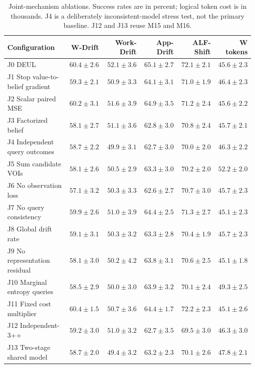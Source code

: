 \documentclass[sigconf,anonymous,review]{acmart}
\theoremstyle{zhplain}
\begin{document}


\begin{table}[t]
\centering
\caption{Joint-mechanism ablations. Success rates are in percent; logical token cost is in thousands. J4 is a deliberately inconsistent-model stress test, not the primary baseline. J12 and J13 reuse M15 and M16.}
\label{tab:joint}
\small
\begin{tabular}{@{}lrrrrr@{}}
\toprule
Configuration & W-Drift & Work-Drift & App-Drift & ALF-Shift & W tokens \\
\midrule
J0 DEUL & \(60.4\!\pm\!2.6\) & \(52.1\!\pm\!3.6\) & \(65.1\!\pm\!2.7\) & \(72.1\!\pm\!2.1\) & \(45.6\!\pm\!2.3\) \\
J1 Stop value-to-belief gradient & \(59.3\!\pm\!2.1\) & \(50.9\!\pm\!3.3\) & \(64.1\!\pm\!3.1\) & \(71.0\!\pm\!1.9\) & \(46.4\!\pm\!2.3\) \\
J2 Scalar paired MSE & \(60.2\!\pm\!3.1\) & \(51.6\!\pm\!3.9\) & \(64.9\!\pm\!3.5\) & \(71.2\!\pm\!2.4\) & \(45.6\!\pm\!2.2\) \\
J3 Factorized belief & \(58.1\!\pm\!2.7\) & \(51.1\!\pm\!3.6\) & \(62.8\!\pm\!3.0\) & \(70.8\!\pm\!2.4\) & \(45.7\!\pm\!2.1\) \\
J4 Independent query outcomes & \(58.7\!\pm\!2.2\) & \(49.9\!\pm\!3.1\) & \(62.7\!\pm\!3.0\) & \(70.0\!\pm\!2.0\) & \(46.3\!\pm\!2.2\) \\
J5 Sum candidate VOIs & \(58.1\!\pm\!2.6\) & \(50.5\!\pm\!2.9\) & \(63.3\!\pm\!3.0\) & \(70.2\!\pm\!2.0\) & \(52.2\!\pm\!2.0\) \\
J6 No observation loss & \(57.1\!\pm\!3.2\) & \(50.3\!\pm\!3.3\) & \(62.6\!\pm\!2.7\) & \(70.7\!\pm\!3.0\) & \(45.7\!\pm\!2.3\) \\
J7 No query consistency & \(59.9\!\pm\!2.6\) & \(51.0\!\pm\!3.9\) & \(64.4\!\pm\!2.5\) & \(71.3\!\pm\!2.7\) & \(45.1\!\pm\!2.3\) \\
J8 Global drift rate & \(59.1\!\pm\!3.1\) & \(50.3\!\pm\!3.2\) & \(63.3\!\pm\!2.8\) & \(70.4\!\pm\!1.9\) & \(45.7\!\pm\!2.3\) \\
J9 No representation residual & \(58.1\!\pm\!3.0\) & \(50.2\!\pm\!4.2\) & \(63.8\!\pm\!3.1\) & \(70.6\!\pm\!2.5\) & \(45.1\!\pm\!1.8\) \\
J10 Marginal entropy queries & \(58.5\!\pm\!2.9\) & \(50.0\!\pm\!3.0\) & \(63.9\!\pm\!3.2\) & \(70.1\!\pm\!2.4\) & \(49.3\!\pm\!2.5\) \\
J11 Fixed cost multiplier & \(60.4\!\pm\!1.5\) & \(50.7\!\pm\!3.6\) & \(64.4\!\pm\!1.7\) & \(72.2\!\pm\!2.3\) & \(45.1\!\pm\!2.6\) \\
J12 Independent-3++ & \(59.2\!\pm\!3.0\) & \(51.0\!\pm\!3.2\) & \(62.7\!\pm\!3.5\) & \(69.5\!\pm\!3.0\) & \(46.3\!\pm\!3.0\) \\
J13 Two-stage shared model & \(58.7\!\pm\!2.0\) & \(49.4\!\pm\!3.2\) & \(63.2\!\pm\!2.3\) & \(70.1\!\pm\!2.6\) & \(47.8\!\pm\!2.1\) \\
\bottomrule
\end{tabular}
\end{table}
\end{document}
